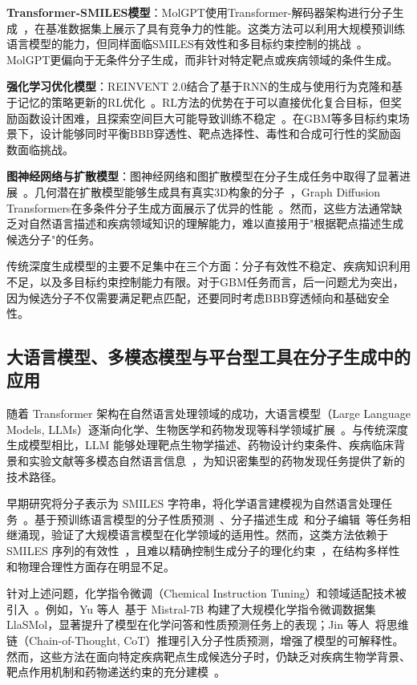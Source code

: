 \textbf{Transformer-SMILES模型}：MolGPT使用Transformer-解码器架构进行分子生成~\cite{Bagal2021}，在基准数据集上展示了具有竞争力的性能。这类方法可以利用大规模预训练语言模型的能力，但同样面临SMILES有效性和多目标约束控制的挑战~\cite{Bagal2021}。MolGPT更偏向于无条件分子生成，而非针对特定靶点或疾病领域的条件生成。

\textbf{强化学习优化模型}：REINVENT 2.0结合了基于RNN的生成与使用行为克隆和基于记忆的策略更新的RL优化~\cite{Blaschke2020}。RL方法的优势在于可以直接优化复合目标，但奖励函数设计困难，且探索空间巨大可能导致训练不稳定~\cite{Zhou2019Exp}。在GBM等多目标约束场景下，设计能够同时平衡BBB穿透性、靶点选择性、毒性和合成可行性的奖励函数面临挑战。

\textbf{图神经网络与扩散模型}：图神经网络和图扩散模型在分子生成任务中取得了显著进展~\cite{Liu2024GraphDiffusion,Xu2023}。几何潜在扩散模型能够生成具有真实3D构象的分子~\cite{Xu2023}，Graph Diffusion Transformers在多条件分子生成方面展示了优异的性能~\cite{Liu2024GraphDiffusion}。然而，这些方法通常缺乏对自然语言描述和疾病领域知识的理解能力，难以直接用于"根据靶点描述生成候选分子"的任务。

传统深度生成模型的主要不足集中在三个方面：分子有效性不稳定、疾病知识利用不足，以及多目标约束控制能力有限。对于GBM任务而言，后一问题尤为突出，因为候选分子不仅需要满足靶点匹配，还要同时考虑BBB穿透倾向和基础安全性。

\subsection{大语言模型、多模态模型与平台型工具在分子生成中的应用}\label{sec:mllm-drug-discovery}

随着 Transformer 架构在自然语言处理领域的成功，大语言模型（Large Language Models, LLMs）逐渐向化学、生物医学和药物发现等科学领域扩展~\cite{jin2025effective}。与传统深度生成模型相比，LLM 能够处理靶点生物学描述、药物设计约束条件、疾病临床背景和实验文献等多模态自然语言信息~\cite{jin2025effective}，为知识密集型的药物发现任务提供了新的技术路径。

早期研究将分子表示为 SMILES 字符串，将化学语言建模视为自然语言处理任务~\cite{Bagal2021}。基于预训练语言模型的分子性质预测~\cite{jin2025effective}、分子描述生成~\cite{jin2025effective}和分子编辑~\cite{Li2025DrugPilot}等任务相继涌现，验证了大规模语言模型在化学领域的适用性。然而，这类方法依赖于 SMILES 序列的有效性~\cite{Bagal2021}，且难以精确控制生成分子的理化约束~\cite{jin2025effective}，在结构多样性和物理合理性方面存在明显不足。

针对上述问题，化学指令微调（Chemical Instruction Tuning）和领域适配技术被引入~\cite{Yu2024}。例如，Yu 等人~\cite{Yu2024}基于 Mistral-7B 构建了大规模化学指令微调数据集 LlaSMol，显著提升了模型在化学问答和性质预测任务上的表现；Jin 等人~\cite{jin2025effective}将思维链（Chain-of-Thought, CoT）推理引入分子性质预测，增强了模型的可解释性。然而，这些方法在面向特定疾病靶点生成候选分子时，仍缺乏对疾病生物学背景、靶点作用机制和药物递送约束的充分建模~\cite{jin2025effective}。

